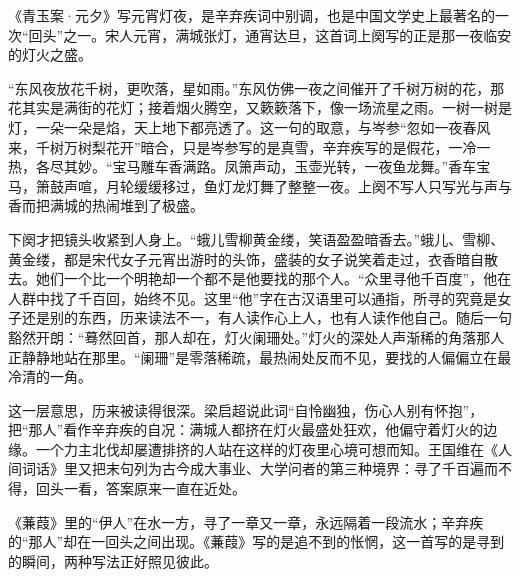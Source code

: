 \begin{appreciation}
《青玉案·元夕》写元宵灯夜，是辛弃疾词中别调，也是中国文学史上最著名的一次“回头”之一。宋人元宵，满城张灯，通宵达旦，这首词上阕写的正是那一夜临安的灯火之盛。

“东风夜放花千树，更吹落，星如雨。”东风仿佛一夜之间催开了千树万树的花，那花其实是满街的花灯；接着烟火腾空，又簌簌落下，像一场流星之雨。一树一树是灯，一朵一朵是焰，天上地下都亮透了。这一句的取意，与岑参“忽如一夜春风来，千树万树梨花开”暗合，只是岑参写的是真雪，辛弃疾写的是假花，一冷一热，各尽其妙。“宝马雕车香满路。凤箫声动，玉壶光转，一夜鱼龙舞。”香车宝马，箫鼓声喧，月轮缓缓移过，鱼灯龙灯舞了整整一夜。上阕不写人只写光与声与香而把满城的热闹堆到了极盛。

下阕才把镜头收紧到人身上。“蛾儿雪柳黄金缕，笑语盈盈暗香去。”蛾儿、雪柳、黄金缕，都是宋代女子元宵出游时的头饰，盛装的女子说笑着走过，衣香暗自散去。她们一个比一个明艳却一个都不是他要找的那个人。“众里寻他千百度”，他在人群中找了千百回，始终不见。这里“他”字在古汉语里可以通指，所寻的究竟是女子还是别的东西，历来读法不一，有人读作心上人，也有人读作他自己。随后一句豁然开朗：“蓦然回首，那人却在，灯火阑珊处。”灯火的深处人声渐稀的角落那人正静静地站在那里。“阑珊”是零落稀疏，最热闹处反而不见，要找的人偏偏立在最冷清的一角。

这一层意思，历来被读得很深。梁启超说此词“自怜幽独，伤心人别有怀抱”，把“那人”看作辛弃疾的自况：满城人都挤在灯火最盛处狂欢，他偏守着灯火的边缘。一个力主北伐却屡遭排挤的人站在这样的灯夜里心境可想而知。王国维在《人间词话》里又把末句列为古今成大事业、大学问者的第三种境界：寻了千百遍而不得，回头一看，答案原来一直在近处。

《蒹葭》里的“伊人”在水一方，寻了一章又一章，永远隔着一段流水；辛弃疾的“那人”却在一回头之间出现。《蒹葭》写的是追不到的怅惘，这一首写的是寻到的瞬间，两种写法正好照见彼此。
\end{appreciation}
